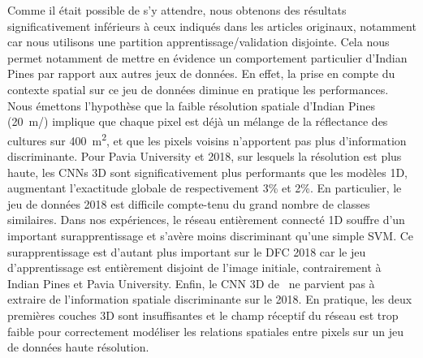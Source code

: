 Comme il était possible de s'y attendre, nous obtenons des résultats significativement inférieurs à ceux indiqués dans les articles originaux, notamment car nous utilisons une partition apprentissage/validation disjointe. Cela nous permet notamment de mettre en évidence un comportement particulier d'Indian Pines par rapport aux autres jeux de données. En effet, la prise en compte du contexte spatial sur ce jeu de données diminue en pratique les performances. Nous émettons l'hypothèse que la faible résolution spatiale d'Indian Pines (\SI{20}{\meter/\px}) implique que chaque pixel est déjà un mélange de la réflectance des cultures sur \SI{400}{\meter\squared}, et que les pixels voisins n'apportent pas plus d'information discriminante.  Pour Pavia University et  2018, sur lesquels la résolution est plus haute, les \glspl{CNN} 3D sont significativement plus performants que les modèles 1D, augmentant l'exactitude globale de respectivement 3\% et 2\%. En particulier, le jeu de données  2018 est difficile compte-tenu du grand nombre de classes similaires. Dans nos expériences, le réseau entièrement connecté 1D souffre d'un important surapprentissage et s'avère moins discriminant qu'une simple \gls{SVM}. Ce surapprentissage est d'autant plus important sur le DFC 2018 car le jeu d'apprentissage est entièrement disjoint de l'image initiale, contrairement à Indian Pines et Pavia University. Enfin, le \gls{CNN} 3D de~\citet{ben_hamida_deep_2016} ne parvient pas à extraire de l'information spatiale discriminante sur le  2018. En pratique, les deux premières couches 3D sont insuffisantes et le champ réceptif du réseau est trop faible pour correctement modéliser les relations spatiales entre pixels sur un jeu de données haute résolution.

